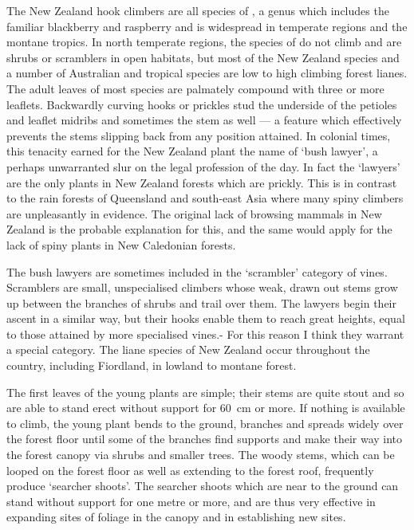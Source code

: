 The New Zealand hook climbers are all species of , a genus which includes the familiar blackberry and raspberry and is widespread in temperate regions and the montane tropics.
In north temperate regions, the species of  do not climb and are shrubs or scramblers in open habitats, but most of the New Zealand species and a number of Australian and tropical species are low to high climbing forest lianes.
The adult leaves of most species are palmately compound with three or more leaflets.
Backwardly curving hooks or prickles stud the underside of the petioles and leaflet midribs and sometimes the stem as well --- a feature which effectively prevents the stems slipping back from any position attained.
In colonial times, this tenacity earned for the New Zealand plant the name of `bush lawyer', a perhaps unwarranted slur on the legal profession of the day.
In fact the `lawyers' are the only plants in New Zealand forests which are prickly.
This is in contrast to the rain forests of Queensland and south-east Asia where many spiny climbers are unpleasantly in evidence.
The original lack of browsing mammals in New Zealand is the probable explanation for this, and the same would apply for the lack of spiny plants in New Caledonian forests.

The bush lawyers are sometimes included in the `scrambler' category of vines.
Scramblers are small, unspecialised climbers whose weak, drawn out stems grow up between the branches of shrubs and trail over them.
The lawyers begin their ascent in a similar way, but their hooks enable them to reach great heights, equal to those attained by more specialised vines.- For this reason I think they warrant a special category.
The liane species of New Zealand  occur throughout the country, including Fiordland, in lowland to montane forest.

The first leaves of the young plants are simple; their stems are quite stout and so are able to stand erect without support for \SI{60}{\centi\metre} or more.
If nothing is available to climb, the young plant bends to the ground, branches and spreads widely over the forest floor until some of the branches find supports and make their way into the forest canopy via shrubs and smaller trees.
The woody stems, which can be looped on the forest floor as well as extending to the forest roof, frequently produce `searcher shoots'.
The searcher shoots which are near to the ground can stand without support for one metre or more, and are thus very effective in expanding sites of  foliage in the canopy and in establishing new sites.

